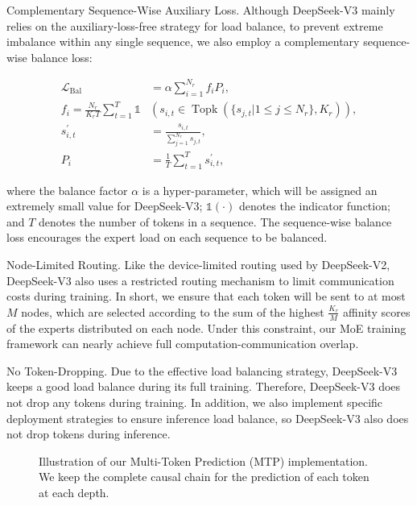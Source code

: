 \documentclass[11pt,a4paper]{article}
\begin{document}
Complementary Sequence-Wise Auxiliary Loss. Although DeepSeek-V3 mainly relies on the auxiliary-loss-free strategy for load balance, to prevent extreme imbalance within any single sequence, we also employ a complementary sequence-wise balance loss:

$$\begin{align}
    \mathcal{L}_{\mathrm{Bal}} & = \alpha \sum_{i=1}^{N_r}{f_i P_i}, \\
    f_i = \frac{N_r}{K_r T} \sum_{t=1}^{T} \mathds{1} & \left( s_{i,t} \in \operatorname{Topk} ( \{ s_{j, t} | 1 \leq j \leq N_r \}, K_{r} ) \right), \\
    s^{\prime}_{i,t} & = \frac{s_{i,t}}{\sum_{j=1}^{N_r} s_{j,t}}, \\
    P_i & = \frac{1}{T} \sum_{t=1}^{T}{s^{\prime}_{i,t}},
\end{align}$$

where the balance factor $\alpha$ is a hyper-parameter, which will be assigned an extremely small value for DeepSeek-V3; $\mathds{1}(\cdot)$ denotes the indicator function; and $T$ denotes the number of tokens in a sequence. The sequence-wise balance loss encourages the expert load on each sequence to be balanced.

Node-Limited Routing. Like the device-limited routing used by DeepSeek-V2, DeepSeek-V3 also uses a restricted routing mechanism to limit communication costs during training. In short, we ensure that each token will be sent to at most $M$ nodes, which are selected according to the sum of the highest $\frac{K_r}{M}$ affinity scores of the experts distributed on each node. Under this constraint, our MoE training framework can nearly achieve full computation-communication overlap.

No Token-Dropping. Due to the effective load balancing strategy, DeepSeek-V3 keeps a good load balance during its full training. Therefore, DeepSeek-V3 does not drop any tokens during training. In addition, we also implement specific deployment strategies to ensure inference load balance, so DeepSeek-V3 also does not drop tokens during inference.

\begin{figure}[h]
\caption{Illustration of our Multi-Token Prediction (MTP) implementation. We keep the complete causal chain for the prediction of each token at each depth.}
\end{figure}
\end{document}
